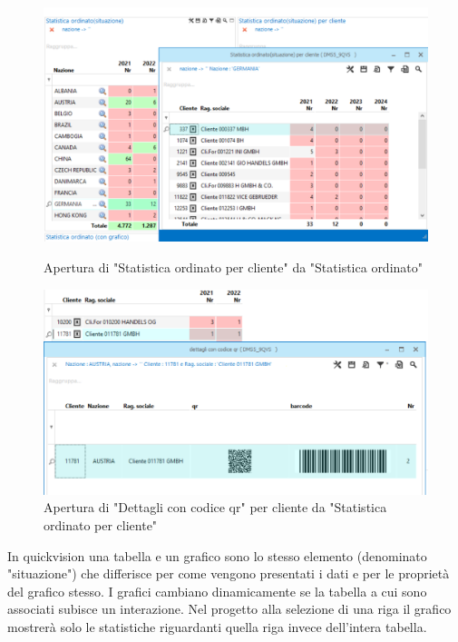 \documentclass[target=bach,aauheader=,style=]{thud}
\begin{document}
\begin{figure}[H]
    \centering
    \begin{minipage}{0.45\textwidth}
        \centering
        \includegraphics[width=\linewidth]{quickvision/apertura tabella cliente.png}
        \caption{Apertura di "Statistica ordinato per cliente" da "Statistica ordinato"}
    \end{minipage}
    \hfill
    \begin{minipage}{0.45\textwidth}
        \centering
        \includegraphics[width=\linewidth]{quickvision/apertura tabella qr.png}
        \caption{Apertura di "Dettagli con codice qr" per cliente da "Statistica ordinato per cliente"}
    \end{minipage}
\end{figure}


In quickvision una tabella e un grafico sono lo stesso elemento (denominato "situazione") che differisce per come vengono presentati i dati e per le proprietà del grafico stesso.
I grafici cambiano dinamicamente se la tabella a cui sono associati subisce un interazione.
Nel progetto alla selezione di una riga il grafico mostrerà solo le statistiche riguardanti quella riga invece dell'intera tabella.
\end{document}
